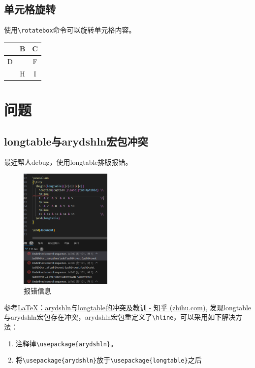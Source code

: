\subsection{单元格旋转}\label{sec:cell-rotate}
使用\lstinline{\rotatebox}命令可以旋转单元格内容。

\begin{codeshow}
    \begin{tabular}{|c|c|c|}
        \hline
        \rotatebox{90}{A} & B     & C \\
        \hline
        D     & \rotatebox{45}{E} & F \\
        \hline
        \rotatebox[origin=l]{90}{G} & H     & I \\
        \hline
    \end{tabular}
\end{codeshow}




\section{问题}

\subsection{longtable与arydshln宏包冲突}\label{subsec:longtable-arydshln-conflict}
最近帮人debug，使用longtable排版报错。
\begin{figure}[!h]
    \centering
    \includegraphics[width=0.4\textwidth]{figure/chap-tab/ary1.png}
    \caption{报错信息}
\end{figure}

参考\href{https://zhuanlan.zhihu.com/p/667681242}{LaTeX：arydshln与longtable的冲突及教训 - 知乎 (zhihu.com)}, 发现longtable与arydshln宏包存在冲突，arydshln宏包重定义了\lstinline{\hline}，可以采用如下解决方法：
\begin{enumerate}
    \item 注释掉\lstinline|\usepackage{arydshln}|。
    \item 将\lstinline|\usepackage{arydshln}|放于\lstinline|\usepackage{longtable}|之后
\end{enumerate}

